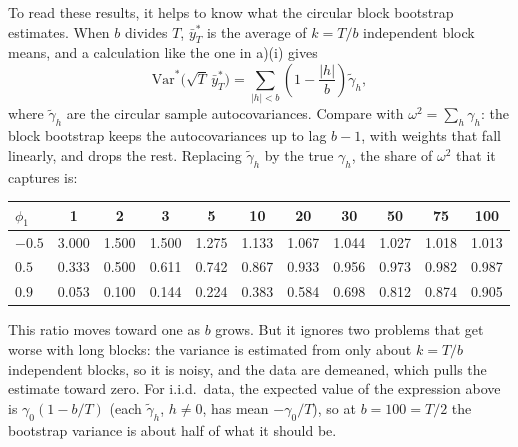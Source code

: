 \documentclass[11pt]{article}
\newcommand{\Var}{\mathrm{Var}}
\newcounter{problem}
\begin{document}
To read these results, it helps to know what the circular block bootstrap estimates. When $b$ divides $T$, $\bar y^*_T$ is the average of $k=T/b$ independent block means, and a calculation like the one in a)(i) gives
\[
\Var^*\big(\sqrt T\,\bar y^*_T\big) = \sum_{|h|<b}\left(1-\frac{|h|}{b}\right)\tilde\gamma_h,
\]
where $\tilde\gamma_h$ are the circular sample autocovariances. Compare with $\omega^2=\sum_h\gamma_h$: the block bootstrap keeps the autocovariances up to lag $b-1$, with weights that fall linearly, and drops the rest. Replacing $\tilde\gamma_h$ by the true $\gamma_h$, the share of $\omega^2$ that it captures is:

\begin{table}[H]
	\centering
	\small
	\begin{tabular}{lcccccccccc}
		\toprule
		$\phi_1$ & 1 & 2 & 3 & 5 & 10 & 20 & 30 & 50 & 75 & 100 \\
		\midrule
		$-0.5$ & 3.000 & 1.500 & 1.500 & 1.275 & 1.133 & 1.067 & 1.044 & 1.027 & 1.018 & 1.013 \\
		$0.5$ & 0.333 & 0.500 & 0.611 & 0.742 & 0.867 & 0.933 & 0.956 & 0.973 & 0.982 & 0.987 \\
		$0.9$ & 0.053 & 0.100 & 0.144 & 0.224 & 0.383 & 0.584 & 0.698 & 0.812 & 0.874 & 0.905 \\
		\bottomrule
	\end{tabular}
\end{table}

This ratio moves toward one as $b$ grows. But it ignores two problems that get worse with long blocks: the variance is estimated from only about $k=T/b$ independent blocks, so it is noisy, and the data are demeaned, which pulls the estimate toward zero. For i.i.d.\ data, the expected value of the expression above is $\gamma_0(1-b/T)$ (each $\tilde\gamma_h$, $h\ne0$, has mean $-\gamma_0/T$), so at $b=100=T/2$ the bootstrap variance is about half of what it should be.
\end{document}
